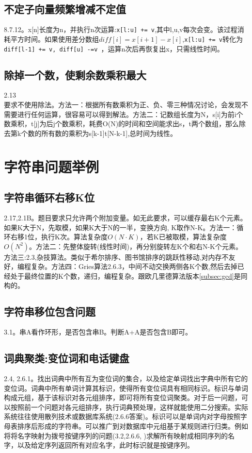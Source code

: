 \subsection{不定子向量频繁增减不定值}
\cite{pp}8.7.12。x[n]长度为n，并执行n次运算:\verb|x[l:u] += v|,其中l,u,v每次会变。该过程消耗平方时间。如果使用差分数组$diff[i]=x[i+1]-x[i]$,\verb|x[l:u] += v|转化为\verb|diff[l-1] += v, diff[u] -=v |，运算n次后再恢复出x，只需线性时间。

\subsection{除掉一个数，使剩余数乘积最大}
\cite{bop}2.13\\
要求不使用除法。方法一：根据所有数乘积为正、负、零三种情况讨论，会发现不需要进行任何运算，很容易可以得到解法。方法二：记数组长度为N，s[i]为前i个数乘积，t[j]为后j个数乘积，耗费O(N)的时间和空间能求出s，t两个数组，那么除去第k个数的所有数的乘积为s[k-1]t[N-k-1],总时间为线性。


\section{字符串问题举例}
\subsection{字符串循环右移K位}
\cite{bop}2.17,\cite{pp}2.1B。题目要求只允许两个附加变量。如无此要求，可以缓存最右K个元素。\\
如果K大于N，先取模，如果K大于N的一半，变换方向, K取作N-K。方法一：循环右移1位，执行K次。算法复杂度$O(N \cdot K)$，若K已被取模，算法复杂度$O(N^2)$。方法二：先整体旋转(线性时间)，再分别旋转左K个和右N-K个元素。方法三:\cite{pp}2.3,杂技算法。类似于希尔排序、图书馆排序的跳跃性移动,对内存不友好，编程复杂。方法四：Gries算法\cite{pp}2.6.3，中间不动交换两侧各K个数,然后去掉已经处于最终位置的K个数，递归，编程复杂。跟欧几里德算法版本\ref{subsec:gcd}是同构的。


\subsection{字符串移位包含问题}
\cite{bop}3.1。串A看作环形，是否包含串B。判断A+A是否包含B即可。


\subsection{词典聚类:变位词和电话键盘}
\cite{pp}2.4, 2.6.1。找出词典中所有互为变位词的集合，以及给定单词找出字典中所有它的变位词。词典中所有单词计算其标识，使得所有变位词具有相同标识。标识与单词构成元组，基于该标识对各元组排序，即可将所有变位词聚类。对于后一问题，可以按照前一个问题对各元组排序，执行词典预处理，这样就能使用二分搜索。实际系统往往使用散列技术或数据库系统(\cite{pp}2.6.6答案)。标识可以是单词内对字母按照字母表排序后形成的字符串。可以推广到对数据库中元组基于某规则进行归类。例如将将名字映射为拨号按键序列的问题(\cite{bop}3.2,\cite{pp}2.6.6, \cite{pie})求解所有映射成相同序列的名字，以及给定序列返回所有对应名字，此时标识就是按键序列。
\label{problem:dictClassify}

